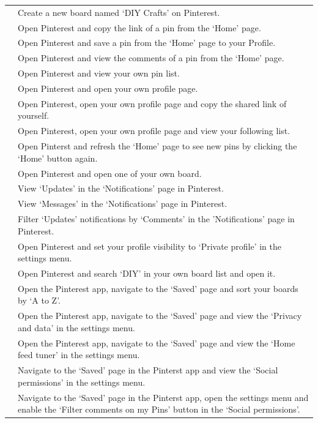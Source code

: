 \begin{longtable}{|p{1.8cm}|p{10.5cm}|}
        & Create a new board named `DIY Crafts' on Pinterest. \\
        & Open Pinterest and copy the link of a pin from the `Home' page. \\
        & Open Pinterest and save a pin from the `Home' page to your Profile. \\
        & Open Pinterest and view the comments of a pin from the `Home' page. \\
        & Open Pinterest and view your own pin list. \\
        & Open Pinterest and open your own profile page. \\
        & Open Pinterest, open your own profile page and copy the shared link of yourself. \\
        & Open Pinterest, open your own profile page and view your following list. \\
        & Open Pinterst and refresh the `Home' page to see new pins by clicking the `Home' button again. \\
        & Open Pinterest and open one of your own board. \\
        & View `Updates' in the `Notifications' page in Pinterest.\\
        & View `Messages' in the `Notifications' page in Pinterest. \\
        & Filter `Updates' notifications by `Comments' in the 'Notifications' page in Pinterest. \\
        & Open Pinterest and set your profile visibility to `Private profile' in the settings menu. \\
        & Open Pinterest and search `DIY' in your own board list and open it. \\
        & Open the Pinterest app, navigate to the `Saved' page and sort your boards by `A to Z'. \\
        & Open the Pinterest app, navigate to the `Saved' page and view the `Privacy and data' in the settings menu. \\
        & Open the Pinterest app, navigate to the `Saved' page and view the `Home feed tuner' in the settings menu. \\
        & Navigate to the `Saved' page in the Pinterst app and view the `Social permissions' in the settings menu. \\
        & Navigate to the `Saved' page in the Pinterst app, open the settings menu and enable the `Filter comments on my Pins' button in the `Social permissions'. \\

\end{longtable}
